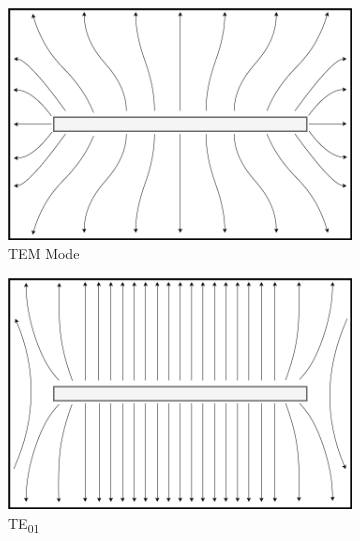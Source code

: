 \begin{figure}[h]
    \centering
    \begin{subfigure}[b]{0.3\linewidth}
        \centering
        \includegraphics[width=\linewidth]{Documentation/content/10_theory/img/tem_cell_mode.png}
        \caption{TEM Mode}
        \label{fig:tem_mode}
    \end{subfigure}
    \begin{subfigure}[b]{0.3\linewidth}
        \centering
        \includegraphics[width=\linewidth]{Documentation/content/10_theory/img/te01_mode.png}
        \caption{TE\textsubscript{01}}
        \label{fig:te01_mode}
    \end{subfigure}
    \begin{subfigure}[b]{0.3\linewidth}
        \centering

\end{subfigure}
\end{figure}
